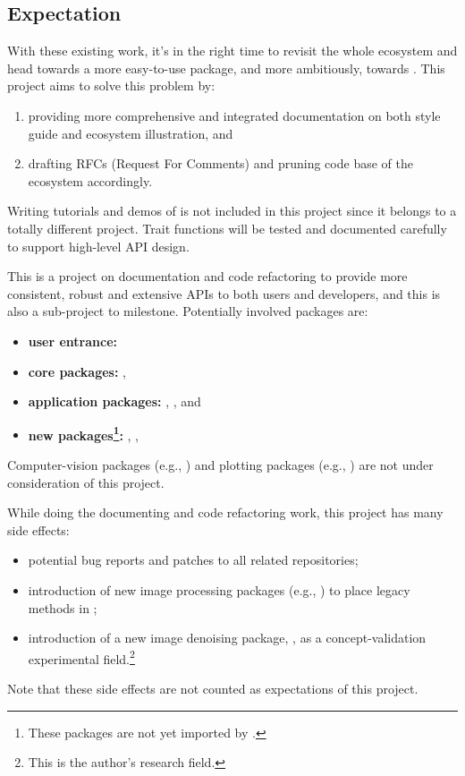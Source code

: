 \newpage
\subsection{Expectation}
With these existing work, it's in the right time to revisit the whole \images{} ecosystem and head towards a more easy-to-use \images{} package, and more ambitiously, towards \images{} . This project aims to solve this problem by:
\begin{enumerate}
    \item providing more comprehensive and integrated documentation on both style guide and ecosystem illustration, and
    \item drafting RFCs (Request For Comments) and pruning code base of the ecosystem accordingly.
\end{enumerate}
Writing tutorials and demos of \images{} is not included in this project since it belongs to a totally different project. Trait functions will be tested and documented carefully to support high-level API design.

{\normalsize
This is a project on documentation and code refactoring to provide more consistent, robust and extensive APIs to both users and developers, and this is also a sub-project to \images{}  milestone. Potentially involved packages are:
\small
\begin{itemize}
    \item \textbf{user entrance:} \repoimages
    \item \textbf{core packages:} \repoimagecore, \repoimageaxes
    \item \textbf{application packages:} \repoimagemorphology, \repoimagetransformations, \repoimagedistance \repoimagemetadata and \repoimagefiltering
    \item \textbf{new packages\footnote{These packages are not yet imported by \images.}:} \repoimagebinarization, \repohistogramthresholding, \repoimageinpainting
\end{itemize}
\normalsize
Computer-vision packages (e.g., \repoimagetracking) and plotting packages (e.g., \repoimageview) are not under consideration of this project.\par}

While doing the documenting and code refactoring work, this project has many side effects:
{\normalsize
\begin{itemize}
    \item potential bug reports and patches to all related \langjulia repositories;
    \item introduction of new image processing packages (e.g., ) to place legacy methods in \images;
    \item introduction of a new image denoising package, \repoimagenoise, as a concept-validation experimental field.\footnote{This is the author's research field.}
\end{itemize}
}
Note that these side effects are not counted as expectations of this project.\par

